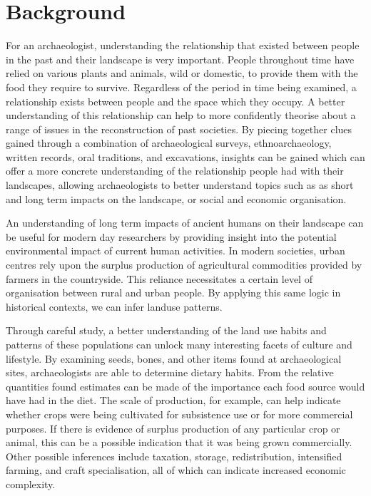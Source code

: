 \section{Background} 
  For an archaeologist, understanding the relationship that existed between
  people in the past and their landscape is very important.  People throughout
  time have relied on various plants and animals, wild or domestic, to provide
  them with the food they require to survive.  Regardless of the period in time
  being examined, a relationship exists between people and the space which they
  occupy.  A better understanding of this relationship can help to more
  confidently theorise about a range of issues in the reconstruction of past
  societies.  By piecing together clues gained through a combination of
  archaeological surveys, ethnoarchaeology, written records, oral traditions,
  and excavations, insights can be gained which can offer a more concrete
  understanding of the relationship people had with their landscapes, allowing
  archaeologists to better understand topics such as as short and long term
  impacts on the landscape, or social and economic organisation. 

  An understanding of long term impacts of ancient humans on their landscape
  can be useful for modern day researchers by providing insight into the potential 
  environmental impact of current human activities. In modern societies, urban 
  centres rely upon the surplus production of agricultural commodities provided 
  by farmers in the countryside.  This reliance necessitates a certain level of 
  organisation between rural and urban people.  By applying this same logic in 
  historical contexts, we can infer landuse patterns.

  Through careful study, a better understanding of the land use habits and
  patterns of these populations can unlock many interesting facets of culture
  and lifestyle.  By examining seeds, bones, and other items found at archaeological
  sites, archaeologists are able to determine dietary habits. From the relative
  quantities found estimates can be made of the importance each food source
  would have had in the diet.  The scale of production, for example, can help
  indicate whether crops were being cultivated for subsistence use or for more
  commercial purposes.  If there is evidence of surplus production of any particular crop
  or animal, this can be a possible indication that it was being grown
  commercially.  Other possible inferences include taxation, storage, redistribution,
  intensified farming, and craft specialisation, all of which can indicate 
  increased economic complexity.
